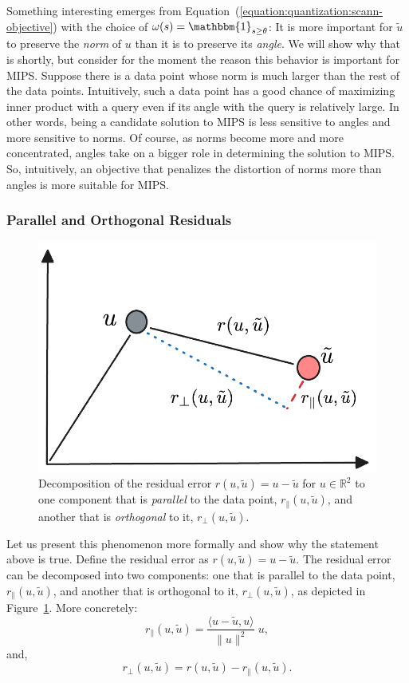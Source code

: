 Something interesting emerges from Equation~(\ref{equation:quantization:scann-objective}) with the choice
of $\omega(s) = \mathbbm{1}_{s \geq \theta}$: It is more important for $\tilde{u}$ to preserve the
\emph{norm} of $u$ than it is to preserve its \emph{angle}. We will show why that is shortly, but
consider for the moment the reason this behavior is important for MIPS.
Suppose there is a data point whose norm is much larger than the rest of the data points.
Intuitively, such a data point has a good chance of maximizing inner product
with a query even if its angle with the query is relatively large.
In other words, being a candidate solution to MIPS is less sensitive to angles and more sensitive
to norms. Of course, as norms become more and more concentrated, angles take on a bigger role in determining
the solution to MIPS. So, intuitively, an objective that penalizes the distortion of norms more than
angles is more suitable for MIPS.

\subsubsection{Parallel and Orthogonal Residuals}

\begin{figure}[t]
    \centering
    \includegraphics[width=0.4\linewidth]{figures/clustering-residual-error-decomposition.png}
    \caption{Decomposition of the residual error $r(u, \tilde{u}) = u - \tilde{u}$ for $u \in \mathbb{R}^2$
    to one component that is \emph{parallel} to the data point, $r_\parallel(u, \tilde{u})$,
    and another that is \emph{orthogonal} to it, $r_\perp(u, \tilde{u})$.}
    \label{figure:quantization:residual-error-decomposition}
\end{figure}

Let us present this phenomenon more formally and show why the statement above is true.
Define the residual error as $r(u, \tilde{u}) = u - \tilde{u}$.
The residual error can be decomposed into two components: one that is parallel to the
data point, $r_{\parallel}(u, \tilde{u})$, and another that is orthogonal to it, $r_\perp(u, \tilde{u})$,
as depicted in Figure~\ref{figure:quantization:residual-error-decomposition}.
More concretely:
\begin{equation*}
    r_\parallel(u, \tilde{u}) = \frac{ \langle u - \tilde{u}, u \rangle}{\lVert u \rVert^2}\; u,
\end{equation*}
and,
\begin{equation*}
    r_\perp(u, \tilde{u}) = r(u, \tilde{u}) - r_\parallel(u, \tilde{u}).
\end{equation*}

